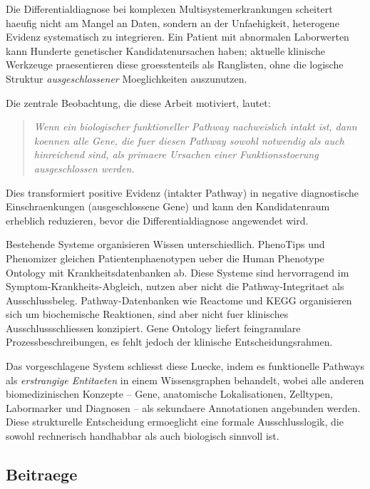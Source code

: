 \documentclass[12pt,a4paper]{article}
\begin{document}
Die Differentialdiagnose bei komplexen Multisystemerkrankungen scheitert haeufig nicht am Mangel an Daten, sondern an der Unfaehigkeit, heterogene Evidenz systematisch zu integrieren. Ein Patient mit abnormalen Laborwerten kann Hunderte genetischer Kandidatenursachen haben; aktuelle klinische Werkzeuge praesentieren diese groesstenteils als Ranglisten, ohne die logische Struktur \emph{ausgeschlossener} Moeglichkeiten auszunutzen.

Die zentrale Beobachtung, die diese Arbeit motiviert, lautet:

\begin{quote}
\emph{Wenn ein biologischer funktioneller Pathway nachweislich intakt ist, dann koennen alle Gene, die fuer diesen Pathway sowohl notwendig als auch hinreichend sind, als primaere Ursachen einer Funktionsstoerung ausgeschlossen werden.}
\end{quote}

Dies transformiert positive Evidenz (intakter Pathway) in negative diagnostische Einschraenkungen (ausgeschlossene Gene) und kann den Kandidatenraum erheblich reduzieren, bevor die Differentialdiagnose angewendet wird.

Bestehende Systeme organisieren Wissen unterschiedlich. PhenoTips \citep{Girdea2013} und Phenomizer \citep{Kohler2009} gleichen Patientenphaenotypen ueber die Human Phenotype Ontology \citep{Robinson2008} mit Krankheitsdatenbanken ab. Diese Systeme sind hervorragend im Symptom-Krankheits-Abgleich, nutzen aber nicht die Pathway-Integritaet als Ausschlussbeleg. Pathway-Datenbanken wie Reactome \citep{Fabregat2018} und KEGG \citep{Kanehisa2023} organisieren sich um biochemische Reaktionen, sind aber nicht fuer klinisches Ausschlussschliessen konzipiert. Gene Ontology \citep{Ashburner2000} liefert feingranulare Prozessbeschreibungen, es fehlt jedoch der klinische Entscheidungsrahmen.

Das vorgeschlagene System schliesst diese Luecke, indem es funktionelle Pathways als \emph{erstrangige Entitaeten} in einem Wissensgraphen behandelt, wobei alle anderen biomedizinischen Konzepte -- Gene, anatomische Lokalisationen, Zelltypen, Labormarker und Diagnosen -- als sekundaere Annotationen angebunden werden. Diese strukturelle Entscheidung ermoeglicht eine formale Ausschlusslogik, die sowohl rechnerisch handhabbar als auch biologisch sinnvoll ist.

\subsection{Beitraege}
\end{document}
